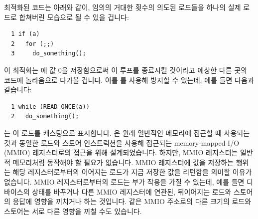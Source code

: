 최적화된 코드는 아래와 같이, 임의의 거대한 횟수의 의도된 로드들을 하나의 실제
로드로 합쳐버린 모습으로 될 수 있을 겁니다:

\vspace{5pt}
\begin{minipage}[t]{\columnwidth}
\scriptsize
\begin{verbatim}
  1 if (a)
  2   for (;;)
  3     do_something();
\end{verbatim}
\end{minipage}
\vspace{5pt}

이 최적화는  에 값 0을 저장함으로써 이 루프를 종료시킬 것이라고 예상한
다른 곳의 코드에 놀라움으로 다가올 겁니다.
이를  를 사용해 방지할 수 있는데, 예를 들면 다음과 같습니다:

\vspace{5pt}
\begin{minipage}[t]{\columnwidth}
\scriptsize
\begin{verbatim}
  1 while (READ_ONCE(a))
  2   do_something();
\end{verbatim}
\end{minipage}
\vspace{5pt}

 는 이 로드를  캐스팅으로 표시합니다.
 은 원래 일반적인 메모리에 접근할 때 사용되는 것과 동일한 로드와
스토어 인스트럭션을 사용해 접근되는 memory-mapped I/O (MMIO) 레지스터로의
접근을 위해 설계되었습니다.
하지만, MMIO 레지스터는 일반적 메모리처럼 동작해야 할 필요가 없습니다.
MMIO 레지스터에 값을 저장하는 행위는 해당 레지스터로부터의 이어지는 로드가 지금
저장한 값을 리턴함을 의미할 이유가 없습니다.
MMIO 레지스터로부터의 로드는 부가 작용을 가질 수 있는데, 예를 들면 디바이스의
상태를 바꾸거나 다른 MMIO 레지스터에 연관된, 뒤이어지는 로드와 스토어의 응답에
영향을 끼치거나 하는 것입니다.
같은 MMIO 주소로의 다른 크기의 로드와 스토어는 서로 다른 영향을 끼칠 수도
있습니다.


